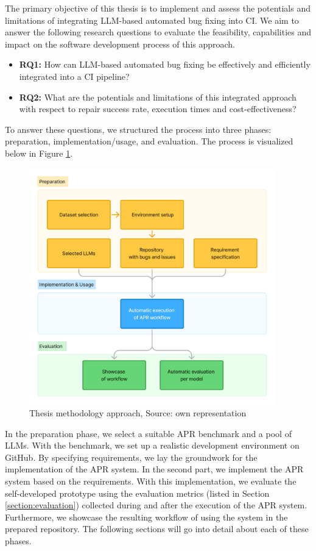 The primary objective of this thesis is to implement and assess the potentials and limitations of integrating LLM-based automated bug fixing into \ac{CI}. We aim to answer the following research questions to evaluate the feasibility, capabilities and impact on the software development process of this approach.

\begin{itemize}
    \item \textbf{RQ1:} How can LLM-based automated bug fixing be effectively and efficiently integrated into a CI pipeline?
    \item \textbf{RQ2:} What are the potentials and limitations of this integrated approach with respect to repair success rate, execution times and cost-effectiveness?
\end{itemize}

To answer these questions, we structured the process into three phases: preparation, implementation/usage, and evaluation. The process is visualized below in Figure \ref{fig:method-overview}.

\begin{figure}[H]
    \centering
    \includegraphics[width=0.95\textwidth]{images/flowcharts/method.png}
    \caption{Thesis methodology approach, Source: own representation}
    \label{fig:method-overview}
\end{figure}

In the preparation phase, we select a suitable \ac{APR} benchmark and a pool of \acp{LLM}. With the benchmark, we set up a realistic development environment on GitHub. By specifying requirements, we lay the groundwork for the implementation of the APR system.
In the second part, we implement the \ac{APR} system based on the requirements.
With this implementation, we evaluate the self-developed prototype using the evaluation metrics (listed in Section \ref{section:evaluation}) collected during and after the execution of the APR system. Furthermore, we showcase the resulting workflow of using the system in the prepared repository.
The following sections will go into detail about each of these phases.

